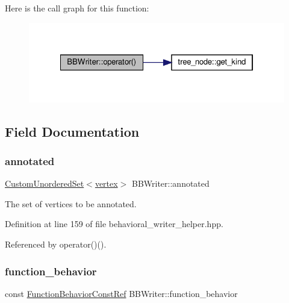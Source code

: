 Here is the call graph for this function\+:
\nopagebreak
\begin{figure}[H]
\begin{center}
\leavevmode
\includegraphics[width=322pt]{d5/df7/classBBWriter_a04cb324b25410008893d31a21d347f2f_cgraph}
\end{center}
\end{figure}


\subsection{Field Documentation}
\mbox{\label{classBBWriter_a6db756c86d6b187e5add16618f0f7e36}} 
\subsubsection{\texorpdfstring{annotated}{annotated}}
{\footnotesize\ttfamily \hyperlink{classCustomUnorderedSet}{Custom\+Unordered\+Set}$<$\hyperlink{graph_8hpp_abefdcf0544e601805af44eca032cca14}{vertex}$>$ B\+B\+Writer\+::annotated\hspace{0.3cm}{\ttfamily [private]}}



The set of vertices to be annotated. 



Definition at line 159 of file behavioral\+\_\+writer\+\_\+helper.\+hpp.



Referenced by operator()().

\mbox{\label{classBBWriter_ad35485f2166f272131e338ae113fc5b1}} 
\subsubsection{\texorpdfstring{function\+\_\+behavior}{function\_behavior}}
{\footnotesize\ttfamily const \hyperlink{function__behavior_8hpp_a94872da12ed056b6ecf90456164e0213}{Function\+Behavior\+Const\+Ref} B\+B\+Writer\+::function\+\_\+behavior\hspace{0.3cm}{\ttfamily [private]}}



